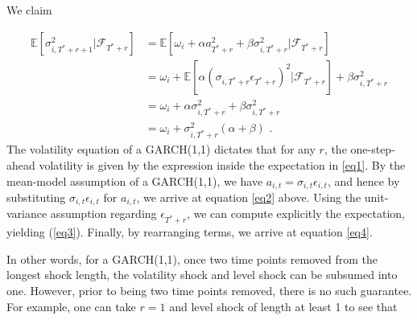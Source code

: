 \documentclass[11pt,3p,review,authoryear]{elsarticle}
\theoremstyle{definition}
\newenvironment{proof-of-proposition}[1][{}]{\noindent{\bf
    Proof of Proposition {#1}}
  \hspace*{.5em}}{\qed\bigskip\\}
\begin{document}
\begin{proof-of-proposition}
We claim

\begin{align}
\mathbb{E}[ \sigma^{2}_{i,T^{*}+r+1} |\mathcal{F}_{T^{*}+r}] & = \mathbb{E}[\omega_{i} + \alpha a_{T^{*}+r}^{2} + \beta\sigma^{2}_{i,T^{*}+r} |\mathcal{F}_{T^{*}+r}] \label{eq1}\\
& = \omega_{i} + \mathbb{E}[\alpha(\sigma_{i,T^{*}+r}\epsilon_{T^{*}+r})^{2} |\mathcal{F}_{T^{*}+r}] + \beta\sigma^{2}_{i,T^{*}+r} \label{eq2}\\
& = \omega_{i} + \alpha\sigma_{i,T^{*}+r}^{2} + \beta\sigma^{2}_{i,T^{*}+r} \label{eq3}\\
& = \omega_{i} + \sigma^{2}_{i,T^{*}+r}(\alpha + \beta) \label{eq4} \text{ .}
\end{align}
The volatility equation of a GARCH(1,1) dictates that for any $r$, the one-step-ahead volatility is given by the expression inside the expectation in \eqref{eq1}.  By the mean-model assumption of a GARCH(1,1), we have $a_{i,t} = \sigma_{i,t}\epsilon_{i,t}$, and hence by substituting $\sigma_{i,t}\epsilon_{i,t}$ for $a_{i,t}$, we arrive at equation \eqref{eq2} above.  Using the unit-variance assumption regarding $\epsilon_{T^{*}+r}$, we can compute explicitly the expectation, yielding (\ref{eq3}).  Finally, by rearranging terms, we arrive at equation \eqref{eq4}.
\end{proof-of-proposition}
In other words, for a GARCH(1,1), once two time points removed from the longest shock length, the volatility shock and level shock can be subsumed into one.  However, prior to being two time points removed, there is no such guarantee.  For example, one can take $r = 1$ and level shock of length at least 1 to see that 
\end{document}
